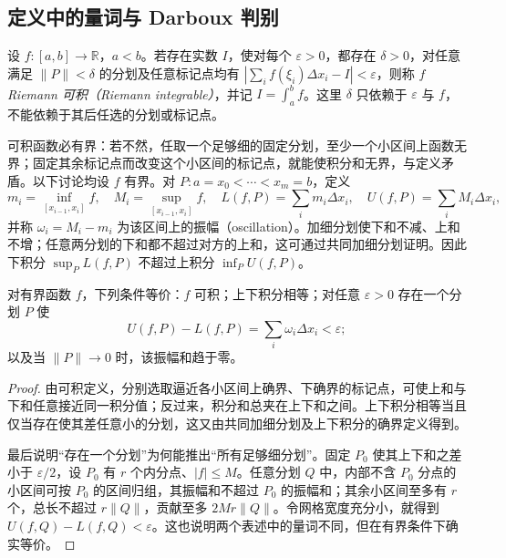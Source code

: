 \subsection{定义中的量词与 Darboux 判别}
\begin{definition}
设 $f:[a,b]\to\mathbb R$，$a<b$。若存在实数 $I$，使对每个 $\varepsilon>0$，都存在 $\delta>0$，对任意满足 $\lVert P\rVert<\delta$ 的分划及任意标记点均有 $|\sum_i f(\xi_i)\Delta x_i-I|<\varepsilon$，则称 $f$ \emph{Riemann 可积（Riemann integrable）}，并记 $I=\int_a^bf$。这里 $\delta$ 只依赖于 $\varepsilon$ 与 $f$，不能依赖于其后任选的分划或标记点。
\end{definition}
可积函数必有界：若不然，任取一个足够细的固定分划，至少一个小区间上函数无界；固定其余标记点而改变这个小区间的标记点，就能使积分和无界，与定义矛盾。以下讨论均设 $f$ 有界。对 $P:a=x_0<\cdots<x_m=b$，定义
\[
 m_i=\inf_{[x_{i-1},x_i]}f,\quad M_i=\sup_{[x_{i-1},x_i]}f,\quad
 L(f,P)=\sum_i m_i\Delta x_i,\quad U(f,P)=\sum_i M_i\Delta x_i,
\]
并称 $\omega_i=M_i-m_i$ 为该区间上的振幅（oscillation）。加细分划使下和不减、上和不增；任意两分划的下和都不超过对方的上和，这可通过共同加细分划证明。因此下积分 $\sup_P L(f,P)$ 不超过上积分 $\inf_P U(f,P)$。

\begin{theorem}
\label{thm:pei-int-darboux}
对有界函数 $f$，下列条件等价：$f$ 可积；上下积分相等；对任意 $\varepsilon>0$ 存在一个分划 $P$ 使
\begin{equation}
 U(f,P)-L(f,P)=\sum_i\omega_i\Delta x_i<\varepsilon;
 \label{eq:pei-int-oscillation-sum}
\end{equation}
以及当 $\lVert P\rVert\to0$ 时，该振幅和趋于零。
\end{theorem}
\begin{proof}
由可积定义，分别选取逼近各小区间上确界、下确界的标记点，可使上和与下和任意接近同一积分值；反过来，积分和总夹在上下和之间。上下积分相等当且仅当存在使其差任意小的分划，这又由共同加细分划及上下积分的确界定义得到。

最后说明“存在一个分划”为何能推出“所有足够细分划”。固定 $P_0$ 使其上下和之差小于 $\varepsilon/2$，设 $P_0$ 有 $r$ 个内分点、$|f|\le M$。任意分划 $Q$ 中，内部不含 $P_0$ 分点的小区间可按 $P_0$ 的区间归组，其振幅和不超过 $P_0$ 的振幅和；其余小区间至多有 $r$ 个，总长不超过 $r\lVert Q\rVert$，贡献至多 $2Mr\lVert Q\rVert$。令网格宽度充分小，就得到 $U(f,Q)-L(f,Q)<\varepsilon$。这也说明两个表述中的量词不同，但在有界条件下确实等价。
\end{proof}

